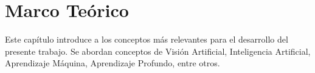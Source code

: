
\chapter{Marco Teórico}

Este capítulo introduce a los conceptos más relevantes para el desarrollo del presente trabajo. Se abordan conceptos de Visión Artificial, Inteligencia Artificial, Aprendizaje Máquina, Aprendizaje Profundo, entre otros.







